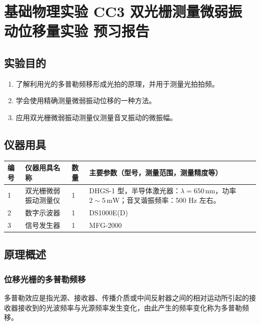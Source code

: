 \documentclass[dvipsnames, svgnames,a4paper,11pt]{article}
\begin{document}
\clearpage

\setcounter{section}{0}
\section{基础物理实验  \quad CC3 双光栅测量微弱振动位移量实验 \quad 预习报告}

	
\subsection{实验目的}
\begin{enumerate}
    \item 了解利用光的多普勒频移形成光拍的原理，并用于测量光拍拍频。
    \item 学会使用精确测量微弱振动位移的一种方法。
    \item 应用双光栅微弱振动测量仪测量音叉振动的微振幅。
\end{enumerate}

\subsection{仪器用具}
\begin{table}[htbp]
	\centering
	\renewcommand\arraystretch{1.6}
	\begin{tabular}{p{}|p{}|p{}|p{}}
	\hline
	编号& 仪器用具名称 & 数量 &  主要参数（型号，测量范围，测量精度等） \\
	\hline
	1 & 双光栅微弱振动测量仪 & 1 & DHGS-1 型，半导体激光器：$\lambda=650\,\mathrm{nm}$，功率 $2\sim5\,\mathrm{mW}$；音叉谐振频率：500 Hz 左右。 \\
        \hline  
        2 & 数字示波器 & 1 & DS1000E(D) \\
        \hline  
        3 & 信号发生器 & 1 & MFG-2000 \\
	\hline
\end{tabular}
\end{table}

\subsection{原理概述}

\subsubsection{位移光栅的多普勒频移}

多普勒效应是指光源、接收器、传播介质或中间反射器之间的相对运动所引起的接收器接收到的光波频率与光源频率发生变化，由此产生的频率变化称为多普勒频移。
\end{document}
